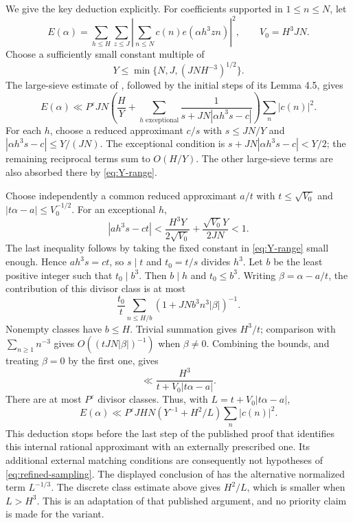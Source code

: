 \documentclass[11pt,letterpaper]{article}
\numberwithin{equation}{section}
\begin{document}
We give the key deduction explicitly.  For coefficients supported in
$1\le n\le N$, let
\[
 E(\alpha)=\sum_{h\le H}\sum_{z\le J}
              \left|\sum_{n\le N}c(n)e(\alpha h^3zn)\right|^2,
 \qquad V_0=H^3JN.
\]
Choose a sufficiently small constant multiple of
\begin{equation}
               Y\le\min\{N,J,(JNH^{-3})^{1/2}\}.
 \label{eq:Y-range}
\end{equation}
The large-sieve estimate of \cite[Lemma 4.4]{VW95}, followed by the
initial steps of its Lemma 4.5, gives
\begin{equation}
 E(\alpha)\ll P^\varepsilon JN
       \left(\frac H Y+\sum_{h\text{ exceptional}}
                       \frac1{s+JN|\alpha h^3s-c|}\right)
                       \sum_n|c(n)|^2.
 \label{eq:exceptional}
\end{equation}
For each $h$, choose a reduced approximant $c/s$ with
$s\le JN/Y$ and $|\alpha h^3s-c|\le Y/(JN)$.
The exceptional condition is
$s+JN|\alpha h^3s-c|<Y/2$; the remaining reciprocal terms sum to
$O(H/Y)$.  The other large-sieve terms are also absorbed there by
\eqref{eq:Y-range}.

Choose independently a common reduced approximant $a/t$ with
$t\le\sqrt{V_0}$ and $|t\alpha-a|\le V_0^{-1/2}$.  For an
exceptional $h$,
\[
 |ah^3s-ct|
 <\frac{H^3Y}{2\sqrt{V_0}}+
      \frac{\sqrt{V_0}Y}{2JN}<1.
\]
The last inequality follows by taking the fixed constant in
\eqref{eq:Y-range} small enough.  Hence $ah^3s=ct$, so $s\mid t$
and $t_0=t/s$ divides $h^3$.  Let $b$ be the least positive integer
such that $t_0\mid b^3$.  Then $b\mid h$ and $t_0\le b^3$.
Writing $\beta=\alpha-a/t$, the contribution of this divisor class is
at most
\[
 \frac{t_0}{t}\sum_{n\le H/b}
                    (1+JN b^3n^3|\beta|)^{-1}.
\]
Nonempty classes have $b\le H$.  Trivial summation gives $H^3/t$;
comparison with $\sum_{n\ge1}n^{-3}$ gives
$O((tJN|\beta|)^{-1})$ when $\beta\ne0$.  Combining the bounds,
and treating $\beta=0$ by the first one, gives
\[
              \ll \frac{H^3}{t+V_0|t\alpha-a|}.
\]
There are at most $P^\varepsilon$ divisor classes.  Thus, with
$L=t+V_0|t\alpha-a|$,
\begin{equation}
 E(\alpha)\ll P^\varepsilon JHN
                  (Y^{-1}+H^2/L)\sum_n|c(n)|^2.
 \label{eq:refined-sampling}
\end{equation}
This deduction stops before the last step of the published proof that
identifies this internal rational approximant with an externally prescribed
one.  Its additional external matching conditions are consequently not
hypotheses of \eqref{eq:refined-sampling}.
The displayed conclusion of \cite[Lemma~4.5]{VW95} has the alternative
normalized term $L^{-1/3}$. The discrete class estimate above gives
$H^2/L$, which is smaller when $L>H^3$. This is an adaptation of that
published argument, and no priority claim is made for the variant.
\end{document}
